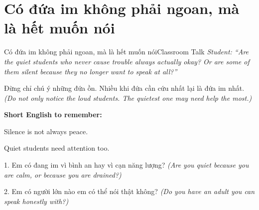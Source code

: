 \section{Có đứa im không phải ngoan, mà là hết muốn nói}
\begin{truyen}{Có đứa im không phải ngoan, mà là hết muốn nói}{Classroom Talk}
\textit{Student: ``Are the quiet students who never cause trouble always actually okay? Or are some of them silent because they no longer want to speak at all?''}\\[4pt]



\end{truyen}

\begin{baihoc}
Đừng chỉ chú ý những đứa ồn. Nhiều khi đứa cần cứu nhất lại là đứa im nhất.
\textit{(Do not only notice the loud students. The quietest one may need help the most.)}
\end{baihoc}

\begin{ghinhoanh}
\textbf{Short English to remember:}

Silence is not always peace.

Quiet students need attention too.
\end{ghinhoanh}

\begin{tuhocnhanh}
1. Em có đang im vì bình an hay vì cạn năng lượng? \textit{(Are you quiet because you are calm, or because you are drained?)}

2. Em có người lớn nào em có thể nói thật không? \textit{(Do you have an adult you can speak honestly with?)}
\end{tuhocnhanh}
\ngancach